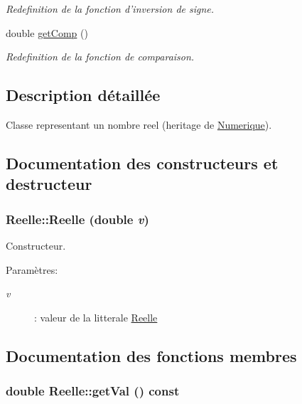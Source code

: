 \begin{CompactItemize}
\begin{CompactList}\small\item\em Redefinition de la fonction d'inversion de signe. \item\end{CompactList}\item 
\hypertarget{class_reelle_5a32997cd26bb14a9445e06b0bd94f29}{
double \hyperlink{class_reelle_5a32997cd26bb14a9445e06b0bd94f29}{getComp} ()}
\label{class_reelle_5a32997cd26bb14a9445e06b0bd94f29}

\begin{CompactList}\small\item\em Redefinition de la fonction de comparaison. \item\end{CompactList}\end{CompactItemize}


\subsection{Description détaillée}
Classe representant un nombre reel (heritage de \hyperlink{class_numerique}{Numerique}). 

\subsection{Documentation des constructeurs et destructeur}
\hypertarget{class_reelle_6fdee6f1628064efbfe4bdcd31a8cfc4}{
\subsubsection[{Reelle}]{\setlength{\rightskip}{0pt plus 5cm}Reelle::Reelle (double {\em v})}}
\label{class_reelle_6fdee6f1628064efbfe4bdcd31a8cfc4}


Constructeur. 

\begin{Desc}
\item[Paramètres:]
\begin{description}
\item[{\em v}]: valeur de la litterale \hyperlink{class_reelle}{Reelle} \end{description}
\end{Desc}


\subsection{Documentation des fonctions membres}
\hypertarget{class_reelle_5ebbb4a65a1143c736b8545fc67af281}{
\subsubsection[{getVal}]{\setlength{\rightskip}{0pt plus 5cm}double Reelle::getVal () const}}
\label{class_reelle_5ebbb4a65a1143c736b8545fc67af281}


